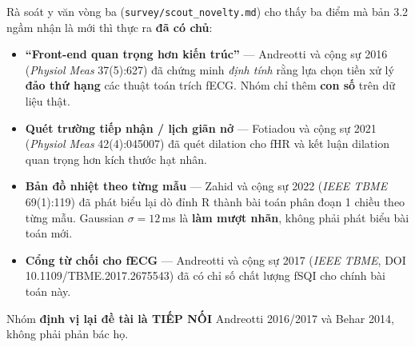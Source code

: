 \begin{canhbao}[title={Ba tuyên bố ``đầu tiên'' mà nhóm RÚT LẠI trong bản 3.3}]
Rà soát y văn vòng ba (\texttt{survey/scout\_novelty.md}) cho thấy ba điểm mà bản 3.2 ngầm nhận là mới
thì thực ra \textbf{đã có chủ}:
\begin{itemize}[leftmargin=1.5em,itemsep=2pt]
\item \textbf{``Front-end quan trọng hơn kiến trúc''} --- Andreotti và cộng sự 2016
(\textit{Physiol Meas} 37(5):627) đã chứng minh \textit{định tính} rằng lựa chọn tiền xử lý
\textbf{đảo thứ hạng} các thuật toán trích fECG. Nhóm chỉ thêm \textbf{con số} trên dữ liệu thật.
\item \textbf{Quét trường tiếp nhận / lịch giãn nở} --- Fotiadou và cộng sự 2021 (\textit{Physiol Meas}
42(4):045007) đã quét dilation cho fHR và kết luận dilation quan trọng hơn kích thước hạt nhân.
\item \textbf{Bản đồ nhiệt theo từng mẫu} --- Zahid và cộng sự 2022 (\textit{IEEE TBME} 69(1):119) đã
phát biểu lại dò đỉnh R thành bài toán phân đoạn 1 chiều theo từng mẫu. Gaussian $\sigma = 12$\,ms là
\textbf{làm mượt nhãn}, không phải phát biểu bài toán mới.
\item \textbf{Cổng từ chối cho fECG} --- Andreotti và cộng sự 2017 (\textit{IEEE TBME},
DOI 10.1109/TBME.2017.2675543) đã có chỉ số chất lượng fSQI cho chính bài toán này.
\end{itemize}
Nhóm \textbf{định vị lại đề tài là TIẾP NỐI} Andreotti 2016/2017 và Behar 2014, không phải phản bác họ.
\end{canhbao}


